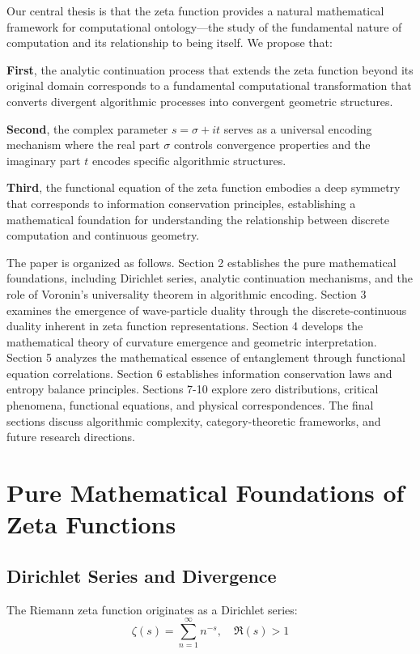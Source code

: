 \documentclass[11pt]{article}
\begin{document}
Our central thesis is that the zeta function provides a natural mathematical framework for computational ontology—the study of the fundamental nature of computation and its relationship to being itself. We propose that:

\textbf{First}, the analytic continuation process that extends the zeta function beyond its original domain corresponds to a fundamental computational transformation that converts divergent algorithmic processes into convergent geometric structures.

\textbf{Second}, the complex parameter $s = \sigma + it$ serves as a universal encoding mechanism where the real part $\sigma$ controls convergence properties and the imaginary part $t$ encodes specific algorithmic structures.

\textbf{Third}, the functional equation of the zeta function embodies a deep symmetry that corresponds to information conservation principles, establishing a mathematical foundation for understanding the relationship between discrete computation and continuous geometry.

The paper is organized as follows. Section 2 establishes the pure mathematical foundations, including Dirichlet series, analytic continuation mechanisms, and the role of Voronin's universality theorem in algorithmic encoding. Section 3 examines the emergence of wave-particle duality through the discrete-continuous duality inherent in zeta function representations. Section 4 develops the mathematical theory of curvature emergence and geometric interpretation. Section 5 analyzes the mathematical essence of entanglement through functional equation correlations. Section 6 establishes information conservation laws and entropy balance principles. Sections 7-10 explore zero distributions, critical phenomena, functional equations, and physical correspondences. The final sections discuss algorithmic complexity, category-theoretic frameworks, and future research directions.

\section{Pure Mathematical Foundations of Zeta Functions}

\subsection{Dirichlet Series and Divergence}

The Riemann zeta function originates as a Dirichlet series:
$$\zeta(s) = \sum_{n=1}^{\infty} n^{-s}, \quad \Re(s) > 1$$
\end{document}
